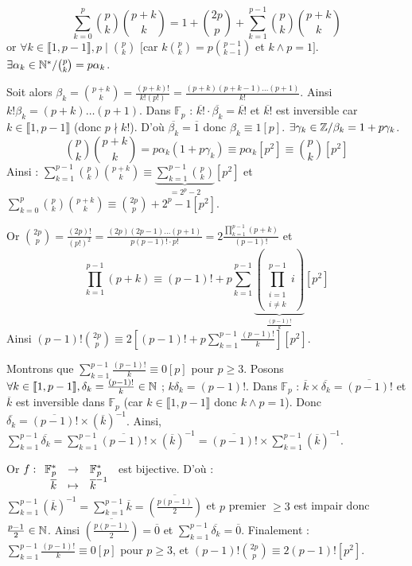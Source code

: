 \begin{solution}
\[ \sum_{k=0}^p \binom{p}{k}\binom{p+k}{k} = 1 + \binom{2p}{p} + \sum_{k=1}^{p-1} \binom{p}{k}\binom{p+k}{k} \]
or $\forall k \in \llbracket 1, p-1 \rrbracket, p \mid \binom{p}{k}$ $\big[$car $k \binom{p}{k} = p \binom{p-1}{k-1}$ et $k \wedge p = 1\big]$.
$\exists \alpha_k \in \mathbb N^* / \binom{p}{k} = p \alpha_k$.

Soit alors $\beta_k = \binom{p+k}{k} = \frac{(p+k)!}{k! (p!)} = \frac{(p+k)(p+k-1)\dots(p+1)}{k!}$.
Ainsi $k! \beta_k = (p+k)\dots(p+1)$.
Dans $\mathbb{F}_p$ : $\overline{k!} \cdot \overline{\beta_k} = \overline{k!}$ et $\overline{k!}$ est inversible car $k \in \llbracket 1, p-1 \rrbracket$ (donc $p \nmid k!$).
D'où $\overline{\beta_k} = \overline{1}$ donc $\beta_k \equiv 1 [p]$.
$\exists \gamma_k \in \mathbb Z / \beta_k = 1 + p \gamma_k$.
\[ \binom{p}{k}\binom{p+k}{k} = p \alpha_k (1 + p \gamma_k) \equiv p \alpha_k [p^2] \equiv \binom{p}{k} [p^2] \]
Ainsi : $\sum_{k=1}^{p-1} \binom{p}{k}\binom{p+k}{k} \equiv \underbrace{\sum_{k=1}^{p-1} \binom{p}{k}}_{= 2^p - 2} [p^2]$ et $\sum_{k=0}^p \binom{p}{k}\binom{p+k}{k} \equiv \binom{2p}{p} + 2^p - 1 [p^2]$.

Or $\binom{2p}{p} = \frac{(2p)!}{(p!)^2} = \frac{(2p)(2p-1)\dots(p+1)}{p(p-1)! \cdot p!} = 2 \frac{\prod_{k=1}^{p-1} (p+k)}{(p-1)!}$
et
\[ \prod_{k=1}^{p-1} (p+k) \equiv (p-1)! + p \sum_{k=1}^{p-1} \underbrace{\left(\prod_{\substack{i=1 \\ i \neq k}}^{p-1} i\right)}_{\frac{(p-1)!}{k}} [p^2] \]
Ainsi $(p-1)! \binom{2p}{p} \equiv 2 \left[ (p-1)! + p \sum_{k=1}^{p-1} \frac{(p-1)!}{k} \right] [p^2]$.

Montrons que $\sum_{k=1}^{p-1} \frac{(p-1)!}{k} \equiv 0 [p]$ pour $p \geq 3$.
Posons $\forall k \in \llbracket 1, p-1 \rrbracket, \delta_k = \frac{(p-1)!}{k} \in \mathbb N$ ; $k \delta_k = (p-1)!$.
Dans $\mathbb{F}_p$ : $\overline{k} \times \overline{\delta_k} = \overline{(p-1)!}$ et $\overline{k}$ est inversible dans $\mathbb{F}_p$ (car $k \in \llbracket 1, p-1 \rrbracket$ donc $k \wedge p = 1$).
Donc $\overline{\delta_k} = \overline{(p-1)!} \times (\overline{k})^{-1}$.
Ainsi, $\sum_{k=1}^{p-1} \overline{\delta_k} = \sum_{k=1}^{p-1} \overline{(p-1)!} \times (\overline{k})^{-1} = \overline{(p-1)!} \times \sum_{k=1}^{p-1} (\overline{k})^{-1}$.

Or $f : \begin{array}[t]{rcl} \mathbb{F}_p^* & \to & \mathbb{F}_p^* \\ \overline{k} & \mapsto & \overline{k}^{-1} \end{array}$ est bijective.
D'où : $\sum_{k=1}^{p-1} (\overline{k})^{-1} = \sum_{k=1}^{p-1} \overline{k} = \overline{\left(\frac{p(p-1)}{2}\right)}$
et $p$ premier $\geq 3$ est impair donc $\frac{p-1}{2} \in \mathbb N$. Ainsi $\overline{\left(\frac{p(p-1)}{2}\right)} = \overline{0}$ et $\sum_{k=1}^{p-1} \overline{\delta_k} = \overline{0}$.
Finalement : $\sum_{k=1}^{p-1} \frac{(p-1)!}{k} \equiv 0 [p]$ pour $p \geq 3$, et $(p-1)! \binom{2p}{p} \equiv 2(p-1)! [p^2]$.


\end{solution}
